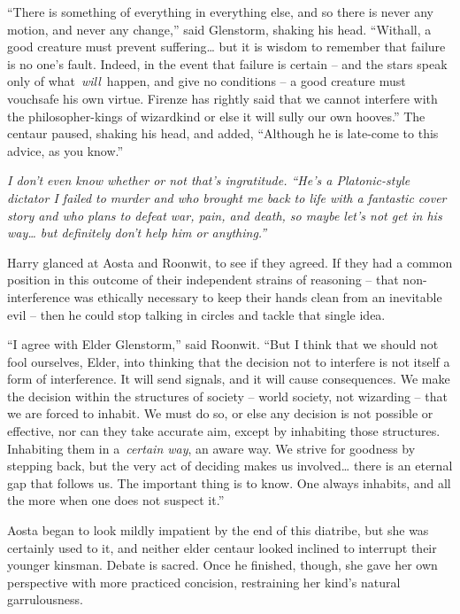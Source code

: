 ``There is something of everything in everything else, and so there is
never any motion, and never any change,'' said Glenstorm, shaking his
head. ``Withall, a good creature must prevent suffering\ldots{} but it
is wisdom to remember that failure is no one's fault. Indeed, in the
event that failure is certain -- and the stars speak only of
what~\emph{will}~happen, and give no conditions -- a good creature must
vouchsafe his own virtue. Firenze has rightly said that we cannot
interfere with the philosopher-kings of wizardkind or else it will sully
our own hooves.'' The centaur paused, shaking his head, and added,
``Although he is late-come to this advice, as you know.''

\emph{I don't even know whether or not that's ingratitude. ``He's a
Platonic-style dictator I failed to murder and who brought me back to
life with a fantastic cover story and who plans to defeat war, pain, and
death, so maybe let's not get in his way\ldots{} but definitely don't
help him or anything.''}

Harry glanced at Aosta and Roonwit, to see if they agreed. If they had a
common position in this outcome of their independent strains of
reasoning -- that non-interference was ethically necessary to keep their
hands clean from an inevitable evil -- then he could stop talking in
circles and tackle that single idea.

``I agree with Elder Glenstorm,'' said Roonwit. ``But I think that we
should not fool ourselves, Elder, into thinking that the decision not to
interfere is not itself a form of interference. It will send signals,
and it will cause consequences. We make the decision within the
structures of society -- world society, not wizarding -- that we are
forced to inhabit. We must do so, or else any decision is not possible
or effective, nor can they take accurate aim, except by inhabiting those
structures. Inhabiting them in a~\emph{certain way}, an aware way. We
strive for goodness by stepping back, but the very act of deciding makes
us involved\ldots{} there is an eternal gap that follows us. The
important thing is to know. One always inhabits, and all the more when
one does not suspect it.''

Aosta began to look mildly impatient by the end of this diatribe, but
she was certainly used to it, and neither elder centaur looked inclined
to interrupt their younger kinsman. Debate is sacred. Once he finished,
though, she gave her own perspective with more practiced concision,
restraining her kind's natural garrulousness.

